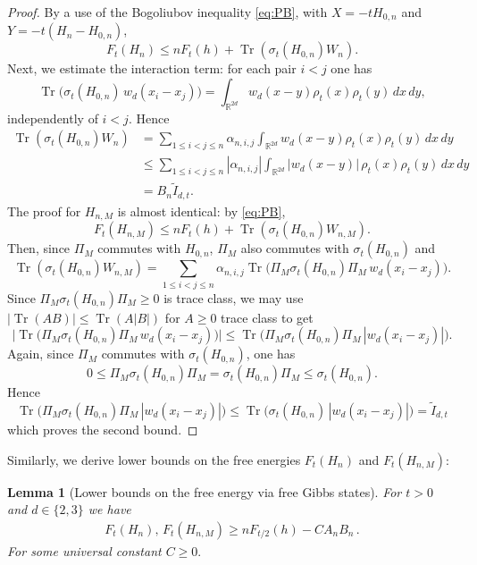 \documentclass[11pt]{amsart}
\newcommand{\1}{\mathbbm{1}}
\newcommand{\Tr}{\operatorname{Tr}}
\newcommand{\R}{\mathbb{R}}
\theoremstyle{plain}
\newtheorem{lemma}[theorem]{Lemma}
\theoremstyle{definition}
\theoremstyle{remark}
\numberwithin{equation}{section}
\begin{document}
\begin{proof}

By a use of the Bogoliubov inequality \eqref{eq:PB}, with $X=-tH_{0,n}$ and $Y=-t(H_n-H_{0,n})$,
\[
F_t(H_{n})
\le
{n}F_t(h)+\Tr(\sigma_t(H_{0,n}) W_n).
\]
Next, we estimate the interaction term: for each pair \(i<j\) one has
\[
\Tr\bigl(\sigma_t(H_{0,n})\, w_d(x_i-x_j)\bigr)
=
\int_{\R^{2d}} w_d(x-y)\rho_t(x)\rho_t(y)\,dx\,dy,
\]
independently of $i<j$. Hence
\begin{align}
\Tr(\sigma_t(H_{0,n}) W_n)
&=
\sum_{1\le i<j\le n}\alpha_{n,i,j}
\int_{\R^{2d}} w_d(x-y)\rho_t(x)\rho_t(y)\,dx\,dy\nonumber\\
&\le
\sum_{1\le i<j\le n}|\alpha_{n,i,j}|
\int_{\R^{2d}} |w_d(x-y)|\,\rho_t(x)\rho_t(y)\,dx\,dy
\nonumber\\
&=
B_n\widetilde I_{d,t}.\nonumber
\end{align}
The proof for \(H_{n,M}\) is almost identical: by \eqref{eq:PB},
\[
F_t(H_{n,M})\le nF_t(h)+\Tr(\sigma_t(H_{0,n}) W_{n,M}).
\]
Then, since \(\Pi_M\) commutes with \(H_{0,n}\), \(\Pi_M\) also commutes with \(\sigma_t(H_{0,n})\) and
\[
\Tr(\sigma_t(H_{0,n}) W_{n,M})
=
\sum_{1\le i<j\le n}\alpha_{n,i,j}\Tr\bigl(\Pi_M\sigma_t(H_{0,n})\Pi_M\, w_d(x_i-x_j)\bigr).
\]
Since \(\Pi_M\sigma_t(H_{0,n})\Pi_M\ge0\) is trace class, we may use $\bigl|\Tr(AB)\bigr|\le \Tr(A|B|)$
 for $A\ge0$ trace class to get
\[
\bigl|\Tr\bigl(\Pi_M\sigma_t(H_{0,n})\Pi_M\, w_d(x_i-x_j)\bigr)\bigr|
\le
\Tr\bigl(\Pi_M\sigma_t(H_{0,n})\Pi_M\, |w_d(x_i-x_j)|\bigr).
\]
Again, since \(\Pi_M\) commutes with \(\sigma_t(H_{0,n})\), one has
\[
0\le \Pi_M\sigma_t(H_{0,n})\Pi_M=\sigma_t(H_{0,n})\Pi_M\le \sigma_t(H_{0,n}).
\]
Hence
\[
\Tr\bigl(\Pi_M\sigma_t(H_{0,n})\Pi_M\, |w_d(x_i-x_j)|\bigr)
\le
\Tr\bigl(\sigma_t(H_{0,n})\, |w_d(x_i-x_j)|\bigr)
=
\widetilde I_{d,t}
\]
which proves the second bound.
\end{proof}
\noindent Similarly, we derive lower bounds on the free energies $F_t(H_n)$ and $F_t(H_{n,M})$:
\begin{lemma}[Lower bounds on the free energy via free Gibbs states]\label{lowerboundsnow}
For $t>0$ and $d\in\{2,3\}$ we have
\begin{align}
F_t(H_n),\, F_t(H_{n,M})\ge 
 nF_{t/2}(h)- CA_n B_n\,.
\end{align}
For some universal constant $C\ge 0.$
\end{lemma}
\end{document}
